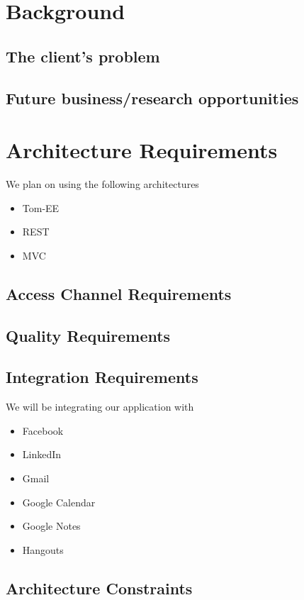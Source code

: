 \documentclass[hidelinks,english]{article}
\begin{document}
	\section{Background}
		\subsection{The client's problem}
		
		
		\subsection{Future business/research opportunities}
	
	
	\section{Architecture Requirements}
	
		We plan on using the following architectures
		\begin{itemize}
		\item Tom-EE
		\item REST 
		\item MVC
		\end{itemize}
		
		\subsection{Access Channel Requirements}
		
		
		\subsection{Quality Requirements}
		
		
		\subsection{Integration Requirements}
		We will be integrating our application with
		\begin{itemize}
		\item Facebook
		\item LinkedIn
		\item Gmail
		\item Google Calendar
		\item Google Notes
		\item Hangouts
		\end{itemize}
		
		\subsection{Architecture Constraints}
	
\end{document}
